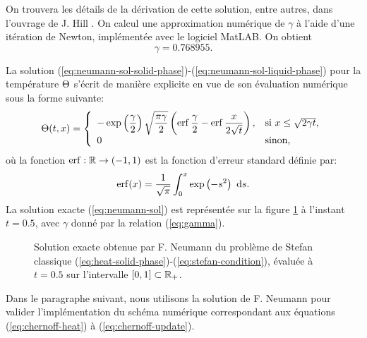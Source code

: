 On trouvera les détails de la dérivation de cette solution, entre
autres, dans l'ouvrage de J. Hill \cite{HillStefanProblems}. On calcul
une approximation numérique de $\gamma$ à l'aide d'une itération de
Newton, implémentée avec le logiciel MatLAB\textregistered. On obtient
\begin{equation}\label{eq:gamma}
  \gamma =\num{0.768955}.
\end{equation}

La solution
(\ref{eq:neumann-sol-solid-phase})-(\ref{eq:neumann-sol-liquid-phase})
pour la température $\Theta$ s'écrit de manière explicite en vue
de son évaluation numérique sous la forme suivante:
\begin{equation}\label{eq:neumann-sol}
  \temperature(t, x) = \left\{
  \begin{array}{ll}
    -\exp\parent{\displaystyle\frac{\gamma}{2}}\sqrt{\displaystyle\frac{\pi\gamma}{2}} %
    \parent{\erf{\displaystyle\frac{\gamma}{2}} - \erf{\displaystyle\frac{x}{2\sqrt{t}}}}, %
    & \text{si } x \leq \sqrt{2\gamma t},\\
    0 %
    & \text{sinon,}
  \end{array}
  \right.
\end{equation}
où la fonction $\operatorname{erf}:\mathbb R\to(-1,1)$ est la fonction d'erreur
standard définie par:
\begin{equation}
  \operatorname{erf}(x) = \frac{1}{\sqrt \pi}\int_0^x \exp\left( -s^2 \right)\,\,\mathrm ds.
\end{equation}
La solution exacte (\ref{eq:neumann-sol}) est représentée sur la
figure \ref{fig:neumann-sol} à l'instant $t = 0.5$, avec $\gamma$
donné par la relation (\ref{eq:gamma}).

\begin{figure}
  \begin{center}
    
    \caption{Solution exacte obtenue par F. Neumann du problème de Stefan classique
      (\ref{eq:heat-solid-phase})-(\ref{eq:stefan-condition}), évaluée
      à $t = 0.5$ sur l'intervalle $[0,1]\subset \mathbb R_+$.}
    \label{fig:neumann-sol}
  \end{center}
\end{figure}

Dans le paragraphe suivant, nous utilisons la solution de F. Neumann
pour valider l'implémentation du schéma numérique correspondant aux
équations (\ref{eq:chernoff-heat}) à (\ref{eq:chernoff-update}).

